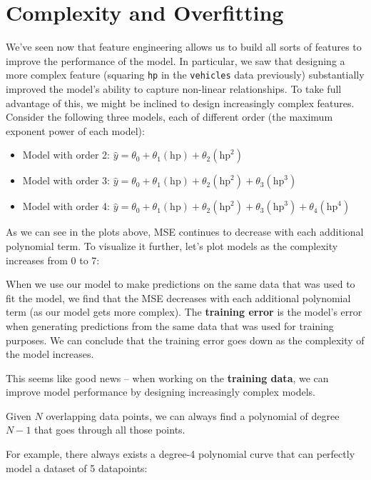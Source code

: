 \documentclass[
  letterpaper,
  DIV=11,
  numbers=noendperiod]{scrreprt}
\providecommand{\tightlist}{%
  \setlength{\itemsep}{0pt}\setlength{\parskip}{0pt}}\usepackage{longtable,booktabs,array}
\begin{document}
\section{Complexity and Overfitting}\label{complexity-and-overfitting}

We've seen now that feature engineering allows us to build all sorts of
features to improve the performance of the model. In particular, we saw
that designing a more complex feature (squaring \texttt{hp} in the
\texttt{vehicles} data previously) substantially improved the model's
ability to capture non-linear relationships. To take full advantage of
this, we might be inclined to design increasingly complex features.
Consider the following three models, each of different order (the
maximum exponent power of each model):

\begin{itemize}
\tightlist
\item
  Model with order 2:
  \(\hat{y} = \theta_0 + \theta_1 (\text{hp}) + \theta_2 (\text{hp}^2)\)
\item
  Model with order 3:
  \(\hat{y} = \theta_0 + \theta_1 (\text{hp}) + \theta_2 (\text{hp}^2) + \theta_3 (\text{hp}^3)\)
\item
  Model with order 4:
  \(\hat{y} = \theta_0 + \theta_1 (\text{hp}) + \theta_2 (\text{hp}^2) + \theta_3 (\text{hp}^3) + \theta_4 (\text{hp}^4)\)
\end{itemize}

As we can see in the plots above, MSE continues to decrease with each
additional polynomial term. To visualize it further, let's plot models
as the complexity increases from 0 to 7:

When we use our model to make predictions on the same data that was used
to fit the model, we find that the MSE decreases with each additional
polynomial term (as our model gets more complex). The \textbf{training
error} is the model's error when generating predictions from the same
data that was used for training purposes. We can conclude that the
training error goes down as the complexity of the model increases.

This seems like good news -- when working on the \textbf{training data},
we can improve model performance by designing increasingly complex
models.

\begin{tcolorbox}[enhanced jigsaw, arc=.35mm, colbacktitle=quarto-callout-tip-color!10!white, coltitle=black, bottomrule=.15mm, leftrule=.75mm, bottomtitle=1mm, colback=white, toptitle=1mm, breakable, titlerule=0mm, rightrule=.15mm, colframe=quarto-callout-tip-color-frame, opacitybacktitle=0.6, left=2mm, title=\textcolor{quarto-callout-tip-color}{\faLightbulb}\hspace{0.5em}{Math Fact: Polynomial Degrees}, toprule=.15mm, opacityback=0]

Given \(N\) overlapping data points, we can always find a polynomial of
degree \(N-1\) that goes through all those points.

For example, there always exists a degree-4 polynomial curve that can
perfectly model a dataset of 5 datapoints:

\end{tcolorbox}
\end{document}
